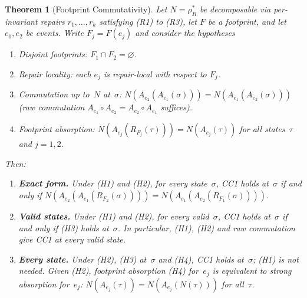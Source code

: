 \documentclass[11pt,a4paper]{article}
\theoremstyle{plain}
\newtheorem{theorem}{Theorem}[section]
\theoremstyle{definition}
\theoremstyle{remark}
\renewcommand{\_}{\textunderscore\allowbreak}
\begin{document}
\begin{theorem}[Footprint Commutativity]
\label{thm:footprint-cc1}
Let $N = \rho_R^*$ be decomposable via per-invariant repairs
$r_1, \ldots, r_k$ satisfying (R1) to (R3), let $F$ be a footprint, and let
$e_1, e_2$ be events.  Write $F_j = F(e_j)$ and consider the hypotheses
\begin{enumerate}[leftmargin=*,nosep,label=(H\arabic*)]
\item Disjoint footprints: $F_1 \cap F_2 = \varnothing$.
\item Repair locality: each $e_j$ is repair-local with respect to $F_j$.
\item Commutation up to~$N$ at~$\sigma$:
  $N(A_{e_2}(A_{e_1}(\sigma))) = N(A_{e_1}(A_{e_2}(\sigma)))$ (raw
  commutation $A_{e_1} \circ A_{e_2} = A_{e_2} \circ A_{e_1}$ suffices).
\item Footprint absorption: $N(A_{e_j}(R_{F_j}(\tau))) = N(A_{e_j}(\tau))$
  for all states~$\tau$ and $j = 1, 2$.
\end{enumerate}
Then:
\begin{enumerate}[leftmargin=*,nosep,label=(\alph*)]
\item \textbf{Exact form.}  Under (H1) and (H2), for every state~$\sigma$,
  CC1 holds at~$\sigma$ if and only if
  $N(A_{e_2}(A_{e_1}(R_{F_2}(\sigma)))) = N(A_{e_1}(A_{e_2}(R_{F_1}(\sigma))))$.
\item \textbf{Valid states.}  Under (H1) and (H2), for every valid~$\sigma$,
  CC1 holds at~$\sigma$ if and only if (H3) holds at~$\sigma$.  In
  particular, (H1), (H2) and raw commutation give CC1 at every valid state.
\item \textbf{Every state.}  Under (H2), (H3) at~$\sigma$ and (H4), CC1 holds
  at~$\sigma$; (H1) is not needed.  Given (H2), footprint absorption (H4)
  for~$e_j$ is equivalent to strong absorption for~$e_j$:
  $N(A_{e_j}(\tau)) = N(A_{e_j}(N(\tau)))$ for all~$\tau$.
\end{enumerate}
\end{theorem}
\end{document}

